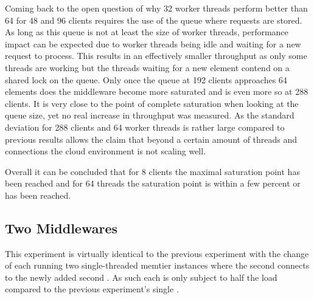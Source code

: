            Coming back to the open question of why 32 worker threads perform better than 64 for 48 and 96 clients
            requires the use of the queue where requests are stored. As long as this queue is not at least the size of
            worker threads, performance impact can be expected due to worker threads being idle and waiting for a new
            request to process. This results in an effectively smaller throughput as only some threads are working but
            the threads waiting for a new element contend on a shared lock on the queue. Only once the queue at 192
            clients approaches 64 elements does the middleware become more saturated and is even more so at 288 clients.
            It is very close to the point of complete saturation when looking at the queue size, yet no real increase in
            throughput was measured. As the standard deviation for 288 clients and 64 worker threads is rather large
            compared to previous results allows the claim that beyond a certain amount of threads and connections the
            cloud environment is not scaling well.

            Overall it can be concluded that for 8 clients the maximal saturation point has been reached
            and for 64 threads the saturation point is within a few percent or has been reached.


    \subsection{Two Middlewares\label{subsec:3_two-middlewares}}

        This experiment is virtually identical to the previous experiment with the change of each \srv{} running two
        single-threaded memtier instances where the second connects to the newly added second \mw{}. As such each \mw{}
        is only subject to half the load compared to the previous experiment's single \mw{}.

